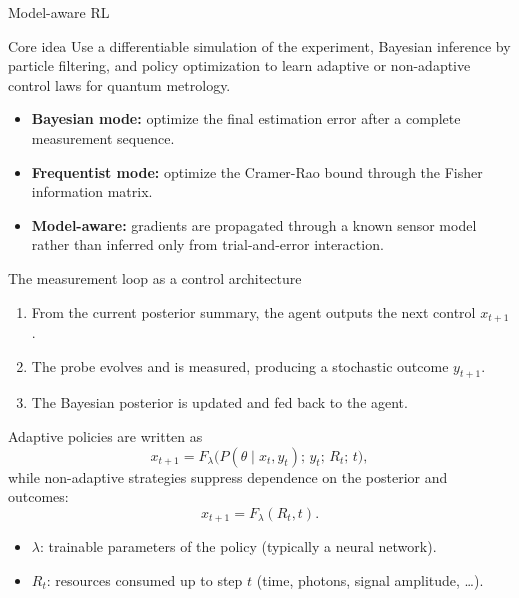 \documentclass[aspectratio=169]{beamer}
\begin{document}
\begin{frame}{Model-aware RL}
\begin{block}{Core idea}
Use a differentiable simulation of the experiment, Bayesian inference by particle filtering, and policy optimization to learn adaptive or non-adaptive control laws for quantum metrology.
\end{block}
\begin{itemize}
  \item \textbf{Bayesian mode:} optimize the final estimation error after a complete measurement sequence.
  \item \textbf{Frequentist mode:} optimize the Cramer-Rao bound through the Fisher information matrix.
  \item \textbf{Model-aware:} gradients are propagated through a known sensor model rather than inferred only from trial-and-error interaction.
\end{itemize}
\end{frame}

\begin{frame}{The measurement loop as a control architecture}
\begin{enumerate}
  \item From the current posterior summary, the agent outputs the next control $x_{t+1}$.
  \item The probe evolves and is measured, producing a stochastic outcome $y_{t+1}$.
  \item The Bayesian posterior is updated and fed back to the agent.
\end{enumerate}
\vspace{0.5em}
Adaptive policies are written as
\[
  x_{t+1}=F_{\lambda}\!\big(P(\theta\mid x_t,y_t);\, y_t;\, R_t;\, t\big),
\]
while non-adaptive strategies suppress dependence on the posterior and outcomes:
\[
  x_{t+1}=F_{\lambda}(R_t,t).
\]
\begin{itemize}
  \item $\lambda$: trainable parameters of the policy (typically a neural network).
  \item $R_t$: resources consumed up to step $t$ (time, photons, signal amplitude, \ldots).
\end{itemize}
\end{frame}
\end{document}
